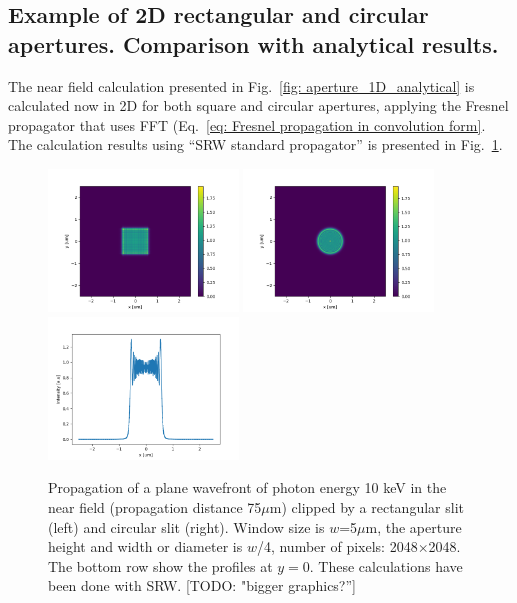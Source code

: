 \documentclass{iucr}              %
\newcommand{\todo}[1]{{\color{red}[TODO: "#1'']}}
\begin{document}
\subsection{Example of 2D rectangular and circular apertures. Comparison with analytical results.}
\label{subch: apertures}

The near field calculation presented in Fig.~\ref{fig: aperture_1D_analytical} is calculated now in 2D for both square and circular apertures, applying the Fresnel propagator that uses FFT (Eq.~\ref{eq: Fresnel propagation in convolution form}. The calculation results using ``SRW standard propagator'' is presented in Fig.~\ref{fig: SRW aperture}. 

\begin{figure}\label{fig: SRW aperture}
\caption{Propagation of a plane wavefront of photon energy 10 keV in the near field (propagation distance 75$\mu$m) clipped by a rectangular slit (left) and circular slit (right). Window size is $w$=5$\mu$m, the aperture height and width or diameter is $w$/4, number of pixels: 2048$\times$2048. The bottom row show the profiles at $y=0$. These calculations have been done with SRW. \todo{bigger graphics?}
}
\includegraphics[width=0.45\textwidth]{aperture_2D_rectangular_srw.png}
\includegraphics[width=0.45\textwidth]{aperture_2D_circular_srw.png}
\includegraphics[width=0.45\textwidth]{aperture_2D_rectangular_profile_srw.png}

\end{figure}
\end{document}
